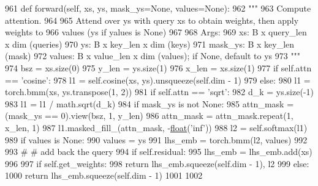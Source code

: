 \begin{DoxyCode}
961     \textcolor{keyword}{def }forward(self, xs, ys, mask\_ys=None, values=None):
962         \textcolor{stringliteral}{"""}
963 \textcolor{stringliteral}{        Compute attention.}
964 \textcolor{stringliteral}{}
965 \textcolor{stringliteral}{        Attend over ys with query xs to obtain weights, then apply weights to}
966 \textcolor{stringliteral}{        values (ys if yalues is None)}
967 \textcolor{stringliteral}{}
968 \textcolor{stringliteral}{        Args:}
969 \textcolor{stringliteral}{            xs: B x query\_len x dim (queries)}
970 \textcolor{stringliteral}{            ys: B x key\_len x dim (keys)}
971 \textcolor{stringliteral}{            mask\_ys: B x key\_len (mask)}
972 \textcolor{stringliteral}{            values: B x value\_len x dim (values); if None, default to ys}
973 \textcolor{stringliteral}{        """}
974         bsz = xs.size(0)
975         y\_len = ys.size(1)
976         x\_len = xs.size(1)
977         \textcolor{keywordflow}{if} self.attn == \textcolor{stringliteral}{'cosine'}:
978             l1 = self.cosine(xs, ys).unsqueeze(self.dim - 1)
979         \textcolor{keywordflow}{else}:
980             l1 = torch.bmm(xs, ys.transpose(1, 2))
981             \textcolor{keywordflow}{if} self.attn == \textcolor{stringliteral}{'sqrt'}:
982                 d\_k = ys.size(-1)
983                 l1 = l1 / math.sqrt(d\_k)
984         \textcolor{keywordflow}{if} mask\_ys \textcolor{keywordflow}{is} \textcolor{keywordflow}{not} \textcolor{keywordtype}{None}:
985             attn\_mask = (mask\_ys == 0).view(bsz, 1, y\_len)
986             attn\_mask = attn\_mask.repeat(1, x\_len, 1)
987             l1.masked\_fill\_(attn\_mask, -\hyperlink{namespaceprojects_1_1controllable__dialogue_1_1make__control__dataset_aa2b7207688c641dbc094ab44eca27113}{float}(\textcolor{stringliteral}{'inf'}))
988         l2 = self.softmax(l1)
989         \textcolor{keywordflow}{if} values \textcolor{keywordflow}{is} \textcolor{keywordtype}{None}:
990             values = ys
991         lhs\_emb = torch.bmm(l2, values)
992 
993         \textcolor{comment}{# # add back the query}
994         \textcolor{keywordflow}{if} self.residual:
995             lhs\_emb = lhs\_emb.add(xs)
996 
997         \textcolor{keywordflow}{if} self.get\_weights:
998             \textcolor{keywordflow}{return} lhs\_emb.squeeze(self.dim - 1), l2
999         \textcolor{keywordflow}{else}:
1000             \textcolor{keywordflow}{return} lhs\_emb.squeeze(self.dim - 1)
1001 
1002 
\end{DoxyCode}


